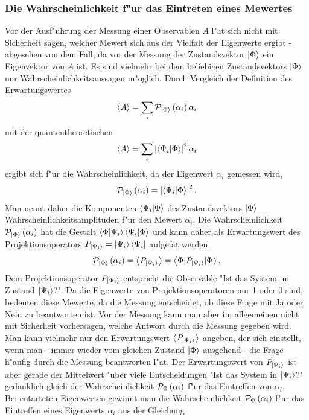        \subsubsection{Die Wahrscheinlichkeit f"ur das Eintreten eines Me\3wertes}
         Vor der Ausf"uhrung der Messung einer Observablen $A$ l"a\3t sich nicht mit Sicherheit sagen, welcher Me\3wert sich aus der Vielfalt der Eigenwerte ergibt -
         abgesehen von dem Fall, da\3 vor der Messung der Zustandsvektor $\left| \Phi \right>$ ein Eigenvektor von $A$ ist. Es sind vielmehr bei dem beliebigen Zustandsvektors
         $\left| \Phi \right>$ nur Wahrscheinlichkeitsaussagen m"oglich. Durch Vergleich der Definition des Erwartungswertes
         $$ \left< A \right> = \sum_i {\cal P}_{\left| \Phi \right>} \left( \alpha_i \right) \alpha_i $$
         mit der quantentheoretischen
         $$ \left< A \right> = \sum_i \left| \left< \Psi_i | \Phi \right> \right|^2 \alpha_i $$
         ergibt sich f"ur die Wahrscheinlichkeit, da\3 der Eigenwert $\alpha_i$ gemessen wird,
         $${\cal P}_{\left| \Phi \right>} \left( \alpha_i \right) = \left| \left< \Psi_i | \Phi \right> \right|^2 .$$
         Man nennt daher die Komponenten $\left< \Psi_i | \Phi \right>$ des Zustandsvektors $\left| \Phi \right>$ Wahrscheinlichkeitsamplituden f"ur den Me\3wert $\alpha_i$.
         Die Wahrscheinlichkeit ${\cal P}_{\left| \Phi \right>} \left( \alpha_i \right)$ hat die Gestalt $\left< \Phi | \Psi_i \right>\left< \Psi_i | \Phi \right>$ und kann daher als Erwartungswert des
         Projektionsoperators $P_{\left| \Psi_i \right>} = \left| \Psi_i \right>\left< \Psi_i \right|$ aufgefa\3t werden,
         $$ {\cal P}_{\left| \Phi \right>} \left( \alpha_i \right) = \left< P_{\left| \Psi_i \right>} \right> = \left< \Phi | P_{\left| \Psi_i \right>} | \Phi \right>.$$
         Dem Projektionsoperator $P_{\left| \Psi_i \right>}$ entspricht die Observable "{}Ist das System im Zustand $\left| \Psi_i \right>$?". Da die Eigenwerte von Projektionsoperatoren nur
         1 oder 0 sind, bedeuten diese Me\3werte, da\3 die Messung entscheidet, ob diese Frage mit Ja oder Nein zu beantworten ist. Vor der Messung kann man aber im allgemeinen 
         nicht mit Sicherheit vorhersagen, welche Antwort durch die Messung gegeben wird. Man kann vielmehr nur den Erwartungswert $\left< P_{\left| \Psi_i \right>} \right>$ angeben, der sich
         einstellt, wenn man - immer wieder vom gleichen Zustand $\left| \Phi \right>$ ausgehend - die Frage h"aufig durch die Messung beantworten l"a\3t. Der Erwartungswert von
         $P_{\left| \Psi_i \right>}$ ist aber gerade der Mittelwert "uber viele Entscheidungen "{}Ist das System in $\left| \Psi_i \right>$?" gedanklich gleich der Wahrscheinlichkeit 
         ${\cal P}_{\Phi} \left( \alpha_i \right)$ f"ur das Eintreffen von $\alpha_i$. \\
         Bei entarteten Eigenwerten gewinnt man die Wahrscheinlichkeit ${\cal P}_{\Phi} \left( \alpha_i \right)$ f"ur das Eintreffen eines Eigenwerts $\alpha_i$ aus der Gleichung
